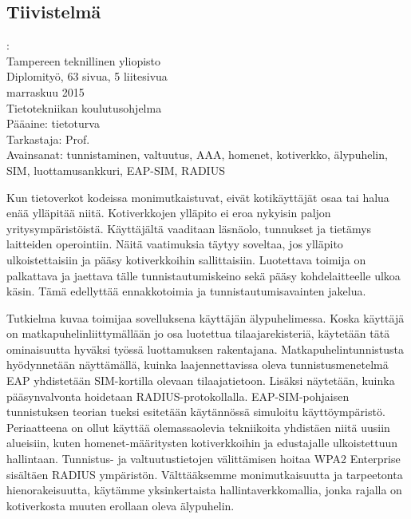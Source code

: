 \documentclass[12pt,a4paper,english]{tutthesis}
\begin{document}
\begin{otherlanguage}{finnish} %
\chapter*{Tiivistelmä}         %

\begin{spacing}{1.0}
         {\bf \textsf{\MakeUppercase{\@author}}}: \@titleB\\  %
         \textsf{Tampereen teknillinen yliopisto}\\
         \textsf{Diplomityö, 63 sivua, 5 liitesivua}\\ %
         \textsf{marraskuu 2015}\\
         \textsf{Tietotekniikan koulutusohjelma}\\
         \textsf{Pääaine: tietoturva}\\
         \textsf{Tarkastaja:  Prof. \@examiner}\\ %
         \textsf{Avainsanat: tunnistaminen, valtuutus, AAA, homenet, kotiverkko, älypuhelin, SIM, luottamusankkuri, EAP-SIM, RADIUS}\\
\end{spacing}
Kun tietoverkot kodeissa monimutkaistuvat, eivät kotikäyttäjät
osaa tai halua enää ylläpitää niitä. Kotiverkkojen ylläpito ei
eroa nykyisin paljon yritysympäristöistä. Käyttäjältä vaaditaan
läsnäolo, tunnukset ja tietämys laitteiden operointiin. Näitä
vaatimuksia
täytyy soveltaa, jos ylläpito ulkoistettaisiin ja pääsy 
kotiverkkoihin sallittaisiin. Luotettava toimija on palkattava
ja jaettava tälle tunnistautumiskeino sekä pääsy kohdelaitteelle
ulkoa käsin. Tämä edellyttää ennakkotoimia ja tunnistautumisavainten jakelua.

Tutkielma kuvaa toimijaa sovelluksena käyttäjän älypuhelimessa.
Koska käyttäjä on matkapuhelinliittymällään jo osa luotettua
tilaajarekisteriä, käytetään tätä ominaisuutta hyväksi työssä 
luottamuksen rakentajana. Matkapuhelintunnistusta hyödynnetään 
näyttämällä, kuinka laajennettavissa oleva tunnistusmenetelmä
EAP yhdistetään SIM-kortilla olevaan tilaajatietoon. Lisäksi
näytetään, kuinka pääsynvalvonta hoidetaan RADIUS-protokollalla.
EAP-SIM-pohjaisen tunnistuksen teorian tueksi esitetään käytännössä
simuloitu käyttöympäristö. Periaatteena on ollut käyttää
olemassaolevia tekniikoita yhdistäen niitä uusiin alueisiin,
kuten homenet-määritysten kotiverkkoihin ja edustajalle ulkoistettuun
hallintaan. Tunnistus- ja valtuutustietojen välittämisen hoitaa
WPA2 Enterprise sisältäen RADIUS ympäristön. Välttääksemme 
monimutkaisuutta ja tarpeetonta hienorakeisuutta, käytämme yksinkertaista 
hallintaverkkomallia, jonka rajalla on kotiverkosta muuten
erollaan oleva älypuhelin.


\end{otherlanguage}
\end{document}

